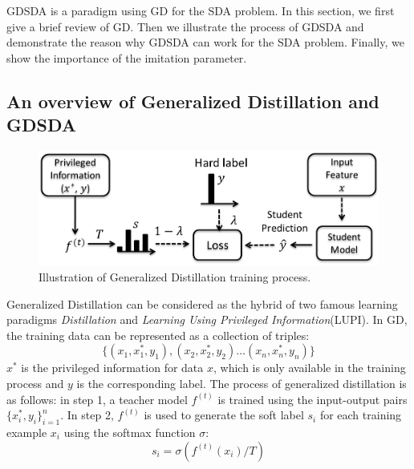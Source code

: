 GDSDA is a paradigm using GD for the SDA problem. In this section, we first give a brief review of GD. Then we illustrate the process of GDSDA and demonstrate the reason why GDSDA can work for the SDA problem. Finally, we show the importance of the imitation parameter. 

\subsection{An overview of Generalized Distillation and GDSDA}
\begin{figure}\label{fig:gd}
	\centering
	\includegraphics[scale=.35]{figure/GD.png}
	\caption{Illustration of Generalized Distillation training process.}
\end{figure}
%
%
{Generalized Distillation} can be considered as the hybrid of two famous learning paradigms \textit{Distillation}\cite{hinton2015distilling} and \textit{Learning Using Privileged Information}(LUPI)\cite{vapnik2015learning}.
In GD, the training data can be represented as a collection of triples:
\[\{\left(x_1,x_1^*,y_1\right),\left(x_2,x_2^*,y_2\right) \dots \left(x_n,x_n^*,y_n\right)\}\]
$x^*$ is the privileged information for data $x$, which is only available in the training process and $y$ is the corresponding label. 
The process of generalized distillation is as follows: in step 1, a teacher model ${f}^{(t)}$ is trained using the input-output pairs $\{x^*_i,y_i\}_{i=1}^n$. In step 2, ${f}^{(t)}$ is used to generate the soft label $s_i$ for each training example $x_i$ using the softmax function $\sigma$:
\begin{equation}\label{eq:softmax_T}
s_i=\sigma(f^{(t)}(x_i)/T)
\end{equation}
